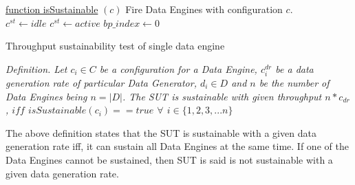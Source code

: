 \documentclass{vldb}
\begin{document}
\begin{algorithm}

    \underline{function isSustainable} $(c)$\;
    Fire Data Engines with configuration $c$. \\
    $c^{st} \gets idle$  
       $c^{st} \gets active$ 
       $bp\_index \gets 0$ 

    \caption{Throughput sustainability test of single data engine}
    \label{alg_sustainable}
\end{algorithm}


\textit{Definition.  Let $c_{i} \in C$ be a configuration for a Data Engine, $c_{i}^{dr}$ be a data generation rate of particular Data Generator, $d_{i} \in D$ and $n$ be the number of Data Engines being $n = |D|$.  The SUT is sustainable with given throughput $n * c_{dr}$,  $iff$ $isSustainable(c_{i})  == true$ $\forall$ $i \in \{1,2,3,...n\}$}

The above definition states that the SUT is sustainable with a given data generation rate iff, it can sustain all Data Engines at the same time. If one of the Data Engines cannot be sustained, then SUT is said is not sustainable with a given data generation rate. 
\end{document}
